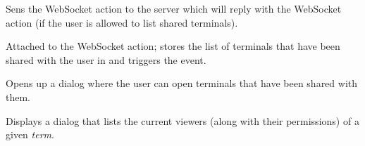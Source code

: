 \documentclass[letterpaper,10pt,openany]{sphinxmanual}
\begin{document}

\begin{fulllineitems}
\label{Applications/terminal/js_terminal:GateOne.Terminal.listSharedTerminals}
Sens the  WebSocket action to the server which will reply with the  WebSocket action (if the user is allowed to list shared terminals).

\end{fulllineitems}


\begin{fulllineitems}
\label{Applications/terminal/js_terminal:GateOne.Terminal.sharedTerminalsAction}
Attached to the  WebSocket action; stores the list of terminals that have been shared with the user in  and triggers the  event.

\end{fulllineitems}


\begin{fulllineitems}
\label{Applications/terminal/js_terminal:GateOne.Terminal.sharedTerminalsDialog}
Opens up a dialog where the user can open terminals that have been shared with them.

\end{fulllineitems}


\begin{fulllineitems}
\label{Applications/terminal/js_terminal:GateOne.Terminal.shareInfo}
Displays a dialog that lists the current viewers (along with their permissions) of a given \emph{term}.

\end{fulllineitems}
\end{document}

